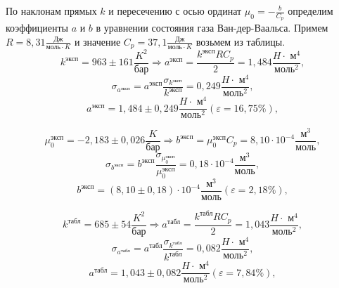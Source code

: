\documentclass[a4paper]{article}
\begin{document}
\begin{enumerate}
По наклонам прямых $k$ и пересечению с осью ординат $\mu_0 = -\frac{b}{C_p}$ определим коэффициенты $a$ и $b$ в уравнении состояния газа Ван-дер-Ваальса. Примем $R = 8,31 \frac{\text{Дж}}{\text{моль}\cdot K}$ и значение $C_p = 37,1 \frac{\text{Дж}}{\text{моль}\cdot K}$ возьмем из таблицы.
\begin{equation*}
	k^{\text{эксп}} = 963 \pm 161 \frac{K^2}{\text{бар}} \Rightarrow a^{\text{эксп}} = \frac{k^{\text{эксп}} R C_p}{2} = 1,484 \frac{H\cdot\text{ м} ^4}{\text{моль} ^2},
\end{equation*}
\begin{equation*}
	\sigma_{a^{\text{эксп}}} = a^{\text{эксп}} \frac{\sigma_{k^{\text{эксп}}}}{k^{\text{эксп}}} = 0,249 \frac{H\cdot\text{ м} ^4}{\text{моль} ^2},
\end{equation*}
\begin{equation*}
	a^{\text{эксп}} = 1,484 \pm 0,249 \frac{H\cdot\text{ м} ^4}{\text{моль} ^2}(\varepsilon = 16,75\%),
\end{equation*}

\begin{equation*}
	\mu_0^{\text{эксп}} = -2,183 \pm 0,026 \frac{K}{\text{бар}} \Rightarrow b^{\text{эксп}} = \mu_0^{\text{эксп}} C_p = 8,10 \cdot 10^{-4} \frac{\text{м} ^3}{\text{моль}},
\end{equation*}
\begin{equation*}
	\sigma_{b^{\text{эксп}}} = b^{\text{эксп}} \frac{\sigma_{\mu_0^{\text{эксп}}}}{\mu_0^{\text{эксп}}} = 0,18 \cdot 10^{-4} \frac{\text{м} ^3}{\text{моль}},
\end{equation*}
\begin{equation*}
	b^{\text{эксп}} = (8,10 \pm 0,18) \cdot 10^{-4} \frac{\text{м} ^3}{\text{моль}}  (\varepsilon = 2,18\%),
\end{equation*}

\begin{equation*}
	k^{\text{табл}} = 685 \pm 54 \frac{K^2}{\text{бар}} \Rightarrow a^{\text{табл}} = \frac{k^{\text{табл}} R C_p}{2} = 1,043 \frac{H\cdot\text{ м} ^4}{\text{моль} ^2},
\end{equation*}
\begin{equation*}
	\sigma_{a^{\text{табл}}} = a^{\text{табл}} \frac{\sigma_{k^{\text{табл}}}}{k^{\text{табл}}} = 0,082 \frac{H\cdot\text{ м} ^4}{\text{моль} ^2},
\end{equation*}
\begin{equation*}
	a^{\text{табл}} = 1,043 \pm 0,082 \frac{H\cdot\text{ м} ^4}{\text{моль} ^2}(\varepsilon = 7,84\%),
\end{equation*}


\end{enumerate}
\end{document}
